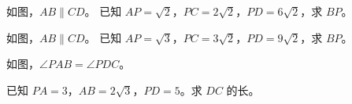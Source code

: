 \documentclass{exam-zh}
\begin{document}

\begin{problem}[points=10]
  \noindent
  \begin{minipage}[t]{\dimexpr\linewidth-60mm-6mm\relax}
    \vspace{0pt}
    如图，$AB\parallel CD$。
已知 $AP=\sqrt{2}$，$PC=2\sqrt{2}$，$PD=6\sqrt{2}$，求 $BP$。
    
  \end{minipage}\hfill
  \begin{diagramcoltikz}{60mm}{}
  }
  \end{diagramcoltikz}
  \par\medskip
  \answerarea[42mm]
\end{problem}



\begin{problem}[points=10]
  \noindent
  \begin{minipage}[t]{\dimexpr\linewidth-60mm-6mm\relax}
    \vspace{0pt}
    如图，$AB\parallel CD$。
已知 $AP=\sqrt{3}$，$PC=3\sqrt{2}$，$PD=9\sqrt{2}$，求 $BP$。
    
  \end{minipage}\hfill
  \begin{diagramcoltikz}{60mm}{}
  }
  \end{diagramcoltikz}
  \par\medskip
  \answerarea[42mm]
\end{problem}



\begin{problem}[points=10]
  \noindent
  \begin{minipage}[t]{\dimexpr\linewidth-60mm-6mm\relax}
    \vspace{0pt}
    如图，$\angle PAB=\angle PDC$。

已知 $PA=3$，$AB=2\sqrt{3}$，$PD=5$。求 $DC$ 的长。
    
  \end{minipage}\hfill
  \begin{diagramcoltikz}{60mm}{}
  }
  \end{diagramcoltikz}
  \par\medskip
  \answerarea[54mm]
\end{problem}
\end{document}

